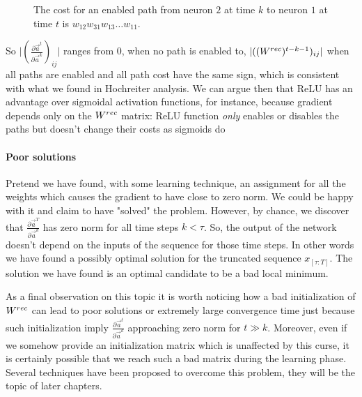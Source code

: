 \begin{figure}
\caption{The cost for an enabled path from neuron $2$ at time $k$ to neuron $1$ at time $t$ is $w_{12}w_{31}w_{13}\hdots w_{11}$. }
\label{gradient_path_cost_relu}
\end{figure}

So $\vert (\frac{\partial \vec{a}^t}{\partial \vec{a}^k})_{ij}\vert$ ranges from 0, when no path is enabled to, $\vert ((W^{rec})^{t-k-1})_{ij} \vert$ when all
paths are enabled and all path cost have the same sign, which is consistent with what we found in Hochreiter analysis.
We can argue then that ReLU has an advantage over sigmoidal activation functions, for instance, because gradient depends only on the $W^{rec}$ matrix:
ReLU function \textit{only} enables or disables the paths but doesn't change their costs as sigmoids do


\paragraph{Poor solutions}
Pretend we have found, with some learning technique, an assignment for all the weights which causes the gradient to have close to zero norm. We could be happy with
it and claim to have "solved" the problem. However, by chance, we discover that $\frac{\partial \vec{a}^T}{\partial \vec{a}^k}$ has zero norm for all
time steps $k<\tau$. So, the output of the network doesn't depend on the inputs of the sequence for those time steps.
In other words we have found a possibly optimal solution for the truncated sequence ${x}_{[\tau:T]}$. The solution we have found is an optimal candidate to
be a bad local minimum.

As a final observation on this topic it is worth noticing how a bad initialization of $W^{rec}$ can lead to poor solutions or extremely large convergence time
just because such initialization imply $\frac{\partial \vec{a}^t}{\partial \vec{a}^k}$ approaching zero norm for $t\gg k$. Moreover, even if we somehow provide
an initialization matrix which is unaffected by this curse, it is certainly possible that we reach such a bad matrix during the learning phase.
Several techniques have been proposed to overcome this problem, they will be the topic of later chapters.





